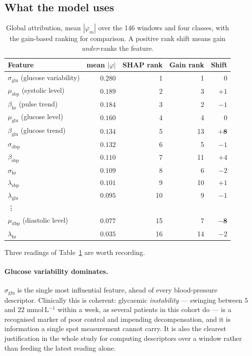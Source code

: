 \documentclass[11pt,a4paper]{article}
\newcommand{\sbp}{\mathrm{sbp}}
\newcommand{\dbp}{\mathrm{dbp}}
\newcommand{\glu}{\mathrm{glu}}
\newcommand{\hr}{\mathrm{hr}}
\begin{document}
\subsection{What the model uses}

\begin{table}[htbp]
\centering
\caption{Global attribution, mean $|\varphi_m|$ over the 146 windows and four
classes, with the gain-based ranking for comparison. A positive rank shift means
gain \emph{under}-ranks the feature.}
\label{tab:shap}
\small
\begin{tabular}{lrrrr}
\toprule
Feature & mean $|\varphi|$ & SHAP rank & Gain rank & Shift \\
\midrule
$\sigma_{\glu}$ \; (glucose variability) & $0.280$ & 1 & 1 & $0$ \\
$\mu_{\sbp}$ \; (systolic level)         & $0.189$ & 2 & 3 & $+1$ \\
$\beta_{\hr}$ \; (pulse trend)           & $0.184$ & 3 & 2 & $-1$ \\
$\mu_{\glu}$ \; (glucose level)          & $0.160$ & 4 & 4 & $0$ \\
$\beta_{\glu}$ \; (glucose trend)        & $0.134$ & 5 & 13 & $\mathbf{+8}$ \\
$\sigma_{\dbp}$                          & $0.132$ & 6 & 5 & $-1$ \\
$\beta_{\sbp}$                           & $0.110$ & 7 & 11 & $+4$ \\
$\sigma_{\hr}$                           & $0.109$ & 8 & 6 & $-2$ \\
$\lambda_{\sbp}$                         & $0.101$ & 9 & 10 & $+1$ \\
$\lambda_{\glu}$                         & $0.095$ & 10 & 9 & $-1$ \\
\quad\vdots & & & & \\
$\mu_{\dbp}$ \; (diastolic level)        & $0.077$ & 15 & 7 & $\mathbf{-8}$ \\
$\lambda_{\hr}$                          & $0.035$ & 16 & 14 & $-2$ \\
\bottomrule
\end{tabular}
\end{table}

Three readings of Table~\ref{tab:shap} are worth recording.

\paragraph{Glucose variability dominates.} $\sigma_{\glu}$ is the single most
influential feature, ahead of every blood-pressure descriptor. Clinically this is
coherent: glycaemic \emph{instability} --- swinging between $5$ and $22$
mmol\,L$^{-1}$ within a week, as several patients in this cohort do --- is a
recognised marker of poor control and impending decompensation, and it is
information a single spot measurement cannot carry. It is also the clearest
justification in the whole study for computing descriptors over a window rather
than feeding the latest reading alone.
\end{document}
